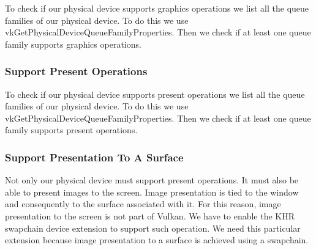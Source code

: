 To check if our physical device supports graphics operations we list all
the queue families of our physical device.
To do this we use vkGetPhysicalDeviceQueueFamilyProperties.
Then we check if at least one queue family supports graphics operations.

\begin{minipage}{\linewidth}{\noindent}
    
\end{minipage}

\subsubsection{Support Present Operations}

To check if our physical device supports present operations we list all
the queue families of our physical device.
To do this we use vkGetPhysicalDeviceQueueFamilyProperties.
Then we check if at least one queue family supports present operations.

\begin{minipage}{\linewidth}{\noindent}
    
\end{minipage}

\subsubsection{Support Presentation To A Surface}

Not only our physical device must support present operations.
It must also be able to present images to the screen.
Image presentation is tied to the window and consequently to the surface
associated with it.
For this reason, image presentation to the screen is not part of Vulkan.
We have to enable the KHR swapchain device extension to support such operation.
We need this particular extension because image presentation to a surface is
achieved using a swapchain.

\begin{minipage}{\linewidth}{\noindent}
    
\end{minipage}

